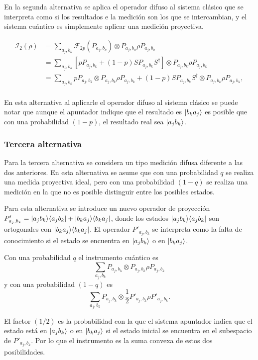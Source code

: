 En la segunda alternativa se aplica el operador difuso al sistema clásico que se interpreta como si los resultados e la medición son los que se intercambian, y el sistema cuántico es simplemente aplicar una medición proyectiva.

\begin{equation}
    \begin{split}
        \mathcal{I}_2(\rho)&=\sum_{a_j,b_k}\mathcal{F}_{2p}(P_{a_j,b_k})\otimes P_{a_j,b_k} \rho P_{a_j,b_k}\\
        &=\sum_{a_j,b_k}[pP_{a_j,b_k}+(1-p)SP_{a_j,b_k}S^\dagger]\otimes P_{a_j,b_k} \rho P_{a_j,b_k}\\
        &=\sum_{a_j,b_k} pP_{a_j,b_k} \otimes P_{a_j,b_k} \rho P_{a_j,b_k}+(1-p)SP_{a_j,b_k}S^\dagger\otimes P_{a_j,b_k} \rho P_{a_j,b_k},\\
    \end{split}
\end{equation} 


En esta alternativa al aplicarle el operador difuso al sistema clásico se puede notar que aunque el apuntador indique que el resultado es $|b_k a_j\rangle$ es posible que con una probabilidad $(1-p)$, el resultado real sea $|a_j b_k\rangle$.



\subsubsection{Tercera alternativa}
Para la tercera alternativa se considera un tipo medición difusa diferente a las dos anteriores. En esta alternativa se asume que con una probabilidad $q$ se realiza una medida proyectiva ideal, pero con una probabilidad $(1-q)$ se realiza una medición en la que no es posible distinguir entre los posibles estados.

Para esta alternativa se introduce un nuevo operador de proyección $P'_{a_j,b_k}=|a_j b_k\rangle \langle a_j b_k|+|b_k a_j\rangle \langle b_k a_j|$, donde los estados $|a_j b_k\rangle \langle a_j b_k|$ son ortogonales con $|b_k a_j\rangle \langle b_k a_j|$. El operador $P'_{a_j,b_k}$ se interpreta como la falta de conocimiento si el estado se encuentra en $|a_j b_k\rangle$ o en $|b_k a_j\rangle$. 



Con una probabilidad $q$ el instrumento cuántico es \[\sum_{a_j,b_k}P_{a_j,b_k}\otimes P_{a_j,b_k}\rho P_{a_j,b_k}\] y con una probabilidad $(1-q)$ es \[\sum_{a_j,b_k} P_{a_j,b_k}\otimes \frac{1}{2} P'_{a_j,b_k}\rho P'_{a_j,b_k}.\]

El factor $(1/2)$ es la probabilidad con la que el sistema apuntador indica  que el estado está en $|a_j b_k\rangle $ o en $|b_k a_j\rangle$ si el estado inicial se encuentra en el subespacio de $P'_{a_j,b_k}$. Por lo que el instrumento es la suma convexa de estos dos posibilidades.

